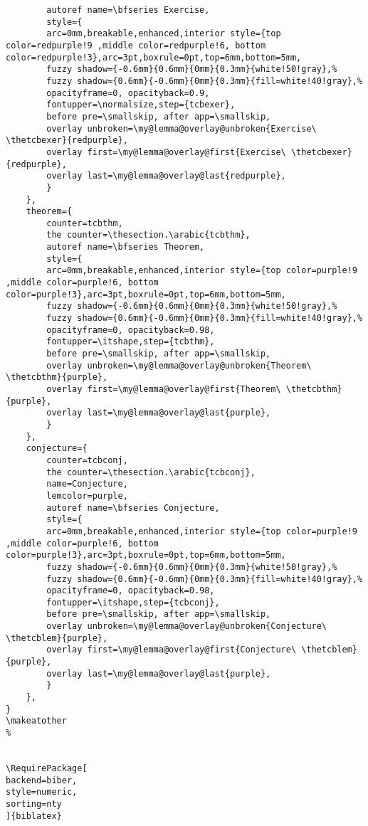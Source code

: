 \documentclass[lang=en,12pt]{beautybook}
\begin{document}
\begin{lstlisting}
        autoref name=\bfseries Exercise,
        style={
        arc=0mm,breakable,enhanced,interior style={top color=redpurple!9 ,middle color=redpurple!6, bottom color=redpurple!3},arc=3pt,boxrule=0pt,top=6mm,bottom=5mm,
        fuzzy shadow={-0.6mm}{0.6mm}{0mm}{0.3mm}{white!50!gray},% 
        fuzzy shadow={0.6mm}{-0.6mm}{0mm}{0.3mm}{fill=white!40!gray},%
        opacityframe=0, opacityback=0.9,
        fontupper=\normalsize,step={tcbexer},
        before pre=\smallskip, after app=\smallskip,
        overlay unbroken=\my@lemma@overlay@unbroken{Exercise\ \thetcbexer}{redpurple},
        overlay first=\my@lemma@overlay@first{Exercise\ \thetcbexer}{redpurple},
        overlay last=\my@lemma@overlay@last{redpurple},
        }
    },
    theorem={
        counter=tcbthm,
        the counter=\thesection.\arabic{tcbthm},
        autoref name=\bfseries Theorem,
        style={
        arc=0mm,breakable,enhanced,interior style={top color=purple!9 ,middle color=purple!6, bottom color=purple!3},arc=3pt,boxrule=0pt,top=6mm,bottom=5mm,
        fuzzy shadow={-0.6mm}{0.6mm}{0mm}{0.3mm}{white!50!gray},% 
        fuzzy shadow={0.6mm}{-0.6mm}{0mm}{0.3mm}{fill=white!40!gray},%
        opacityframe=0, opacityback=0.98,
        fontupper=\itshape,step={tcbthm},
        before pre=\smallskip, after app=\smallskip,
        overlay unbroken=\my@lemma@overlay@unbroken{Theorem\ \thetcbthm}{purple},
        overlay first=\my@lemma@overlay@first{Theorem\ \thetcbthm}{purple},
        overlay last=\my@lemma@overlay@last{purple},
        }
    },
    conjecture={
        counter=tcbconj,
        the counter=\thesection.\arabic{tcbconj},
        name=Conjecture, 
        lemcolor=purple, 
        autoref name=\bfseries Conjecture,
        style={
        arc=0mm,breakable,enhanced,interior style={top color=purple!9 ,middle color=purple!6, bottom color=purple!3},arc=3pt,boxrule=0pt,top=6mm,bottom=5mm,
        fuzzy shadow={-0.6mm}{0.6mm}{0mm}{0.3mm}{white!50!gray},% 
        fuzzy shadow={0.6mm}{-0.6mm}{0mm}{0.3mm}{fill=white!40!gray},%
        opacityframe=0, opacityback=0.98,
        fontupper=\itshape,step={tcbconj},
        before pre=\smallskip, after app=\smallskip,
        overlay unbroken=\my@lemma@overlay@unbroken{Conjecture\ \thetcblem}{purple},
        overlay first=\my@lemma@overlay@first{Conjecture\ \thetcblem}{purple},
        overlay last=\my@lemma@overlay@last{purple},
        }
    },
}
\makeatother
%


\RequirePackage[
backend=biber,
style=numeric,
sorting=nty
]{biblatex}



\end{lstlisting}
\end{document}
